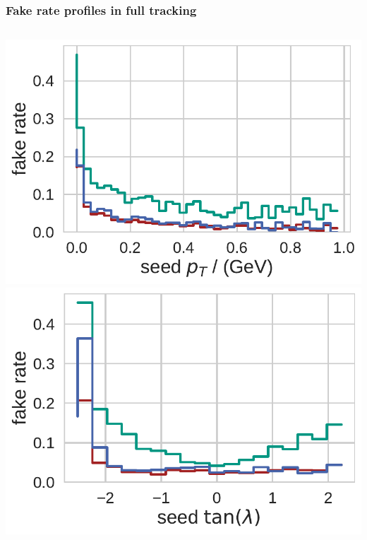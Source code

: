 \documentclass[18pt, aspectratio=169]{beamer}
\begin{document}
\begin{frame}
  \frametitle{Fake rate profiles in full tracking}
  \begin{columns}
      \begin{column}{.5\textwidth}
      \centering
      \includegraphics[width=.55\textwidth]{figures/fake_rate_by_pt_truth_fullreco_trainedWithFakes.pdf}\\
      \includegraphics[width=.55\textwidth]{figures/fake_rate_by_tan_lambda_truth_fullreco_trainedWithFakes.pdf}
    \end{column}


\end{columns}
\end{frame}
\end{document}
